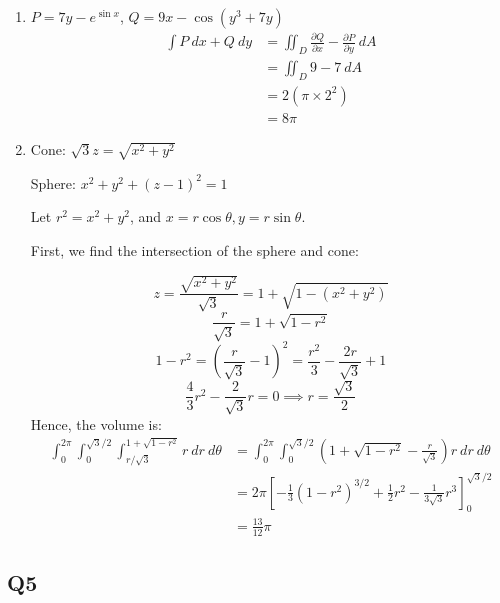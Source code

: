 \documentclass{article}
\newcommand{\p}[2]{\frac{\partial #1}{\partial #2}}
\newcommand{\paren}[1]{\left(#1\right)}
\newcommand{\brac}[1]{\left[#1\right]}
\begin{document}
\begin{enumerate}[label=(\alph*)]
\item
$P = 7y - e^{\sin x}$, $Q = 9x - \cos(y^3+7y)$
\begin{align*}
\int P\ dx + Q\ dy &= \iint_D \p{Q}{x} - \p{P}{y}\ dA \\
&= \iint_D 9-7\ dA \\
&= 2 (\pi \times 2^2) \\
&= 8\pi
\end{align*}
\item
Cone: $\sqrt{3}z = \sqrt{x^2+y^2}$

Sphere: $x^2+y^2+(z-1)^2 = 1$

Let $r^2 = x^2 + y^2$, and $x = r\cos \theta, y = r\sin \theta$.

First, we find the intersection of the sphere and cone:

\[
z = \frac{\sqrt{x^2+y^2}}{\sqrt{3}} = 1+\sqrt{1-(x^2+y^2)}
\]
\[
\frac{r}{\sqrt{3}} = 1 + \sqrt{1-r^2}
\]
\[
1-r^2 = \paren{\frac{r}{\sqrt{3}} - 1}^2 = \frac{r^2}{3} - \frac{2r}{\sqrt{3}} + 1
\]
\[
\frac{4}{3}r^2 - \frac{2}{\sqrt{3}}r = 0 \implies r=\frac{\sqrt{3}}{2}
\]
Hence, the volume is:
\begin{align*}
\int_0^{2\pi} \int_0^{\sqrt{3}/2} \int_{r/\sqrt{3}}^{1+\sqrt{1-r^2}} r\ dr\ d\theta
&= \int_0^{2\pi} \int_0^{\sqrt{3}/2} \paren{1+\sqrt{1-r^2} - \frac{r}{\sqrt{3}}} r\ dr\ d\theta \\
&= 2\pi \brac{-\frac{1}{3}(1-r^2)^{3/2} + \frac{1}{2}r^2 - \frac{1}{3\sqrt{3}}r^3}_0^{\sqrt{3}/2} \\
&= \frac{13}{12}\pi
\end{align*}
\end{enumerate}

\subsection*{Q5}
\end{document}

